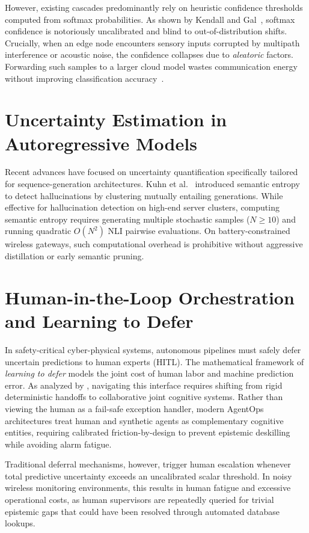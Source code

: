 However, existing cascades predominantly rely on heuristic confidence thresholds computed from softmax probabilities. As shown by Kendall and Gal~\cite{kendall2017uncertainties}, softmax confidence is notoriously uncalibrated and blind to out-of-distribution shifts. Crucially, when an edge node encounters sensory inputs corrupted by multipath interference or acoustic noise, the confidence collapses due to \emph{aleatoric} factors. Forwarding such samples to a larger cloud model wastes communication energy without improving classification accuracy~\cite{buttyan2010application}.

\section{Uncertainty Estimation in Autoregressive Models}
\label{sec:related_uncertainty_quant}

Recent advances have focused on uncertainty quantification specifically tailored for sequence-generation architectures. Kuhn et al.~\cite{kuhn2023semantic} introduced semantic entropy to detect hallucinations by clustering mutually entailing generations. While effective for hallucination detection on high-end server clusters, computing semantic entropy requires generating multiple stochastic samples ($N \ge 10$) and running quadratic $O(N^2)$ NLI pairwise evaluations. On battery-constrained wireless gateways, such computational overhead is prohibitive without aggressive distillation or early semantic pruning.

\section{Human-in-the-Loop Orchestration and Learning to Defer}
\label{sec:related_hitl}

In safety-critical cyber-physical systems, autonomous pipelines must safely defer uncertain predictions to human experts (\ac{HITL}). The mathematical framework of \emph{learning to defer} models the joint cost of human labor and machine prediction error. As analyzed by \textcite{meissner2026human}, navigating this interface requires shifting from rigid deterministic handoffs to collaborative joint cognitive systems. Rather than viewing the human as a fail-safe exception handler, modern AgentOps architectures treat human and synthetic agents as complementary cognitive entities, requiring calibrated friction-by-design to prevent epistemic deskilling while avoiding alarm fatigue.

Traditional deferral mechanisms, however, trigger human escalation whenever total predictive uncertainty exceeds an uncalibrated scalar threshold. In noisy wireless monitoring environments, this results in human fatigue and excessive operational costs, as human supervisors are repeatedly queried for trivial epistemic gaps that could have been resolved through automated database lookups.

